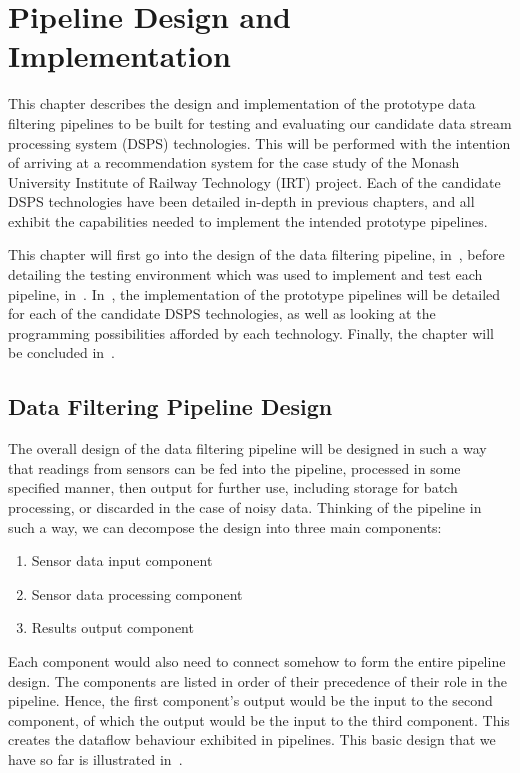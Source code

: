 \chapter{Pipeline Design and Implementation}
\label{sec:implementation}

This chapter describes the design and implementation of the prototype data filtering pipelines to be built for testing
and evaluating our candidate data stream processing system (DSPS) technologies. This will be performed with the intention
of arriving at a recommendation system for the case study of the Monash University Institute of Railway Technology (IRT)
project. Each of the candidate DSPS technologies have been detailed in-depth in previous chapters, and all exhibit the capabilities
needed to implement the intended prototype pipelines.

This chapter will first go into the design of the data filtering pipeline, in~, before
detailing the testing environment which was used to implement and test each pipeline, in~.
In~, the implementation of the prototype pipelines will be
detailed for each of the candidate DSPS technologies, as well as looking at the programming possibilities afforded by
each technology. Finally, the chapter will be concluded in~.


\section{Data Filtering Pipeline Design} %
\label{sub:pipeline_design}

The overall design of the data filtering pipeline will be designed in such a way that readings from sensors can be fed
into the pipeline, processed in some specified manner, then output for further use, including storage for batch processing,
or discarded in the case of noisy data. Thinking of the pipeline in such a way, we can decompose the design into three main
components:

\begin{enumerate}
  \item Sensor data input component
  \item Sensor data processing component
  \item Results output component
\end{enumerate}

Each component would also need to connect somehow to form the entire pipeline design. The components are listed
in order of their precedence of their role in the pipeline. Hence, the first component's output would be the input to
the second component, of which the output would be the input to the third component. This creates the dataflow behaviour
exhibited in pipelines. This basic design that we have so far is illustrated in~.

